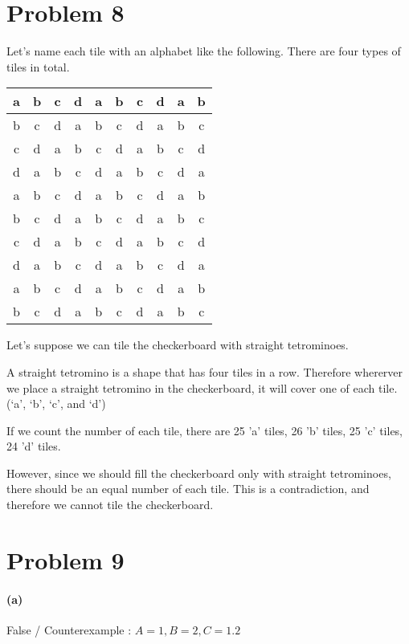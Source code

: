\documentclass[10pt]{article}
\begin{document}
\section*{Problem 8} 
Let's name each tile with an alphabet like the following. There are four types of tiles in total.
\begin{table}[H]
  \centering
  \renewcommand{\arraystretch}{1.2}
  \begin{tabular}{|c|c|c|c|c|c|c|c|c|c|}
    \hline
    a&b&c&d&a&b&c&d&a&b \\ \hline
    b&c&d&a&b&c&d&a&b&c \\ \hline
    c&d&a&b&c&d&a&b&c&d \\ \hline
    d&a&b&c&d&a&b&c&d&a \\ \hline
    a&b&c&d&a&b&c&d&a&b \\ \hline
    b&c&d&a&b&c&d&a&b&c \\ \hline
    c&d&a&b&c&d&a&b&c&d \\ \hline
    d&a&b&c&d&a&b&c&d&a \\ \hline
    a&b&c&d&a&b&c&d&a&b \\ \hline
    b&c&d&a&b&c&d&a&b&c \\ \hline
  \end{tabular}
\end{table}
Let's suppose we can tile the checkerboard with straight tetrominoes.

\vspace{0.3cm} A straight tetromino is a shape that has four tiles in a row. 
Therefore whererver we place a straight tetromino in the checkerboard, it will cover one of each tile. (`a', `b', `c', and `d')

\vspace{0.3cm} If we count the number of each tile, there are 25 'a' tiles, 26 'b' tiles, 25 'c' tiles, 24 'd' tiles.

\vspace{0.3cm} However, since we should fill the checkerboard only with straight tetrominoes, there should be an equal number of each tile.
This is a contradiction, and therefore we cannot tile the checkerboard.

\section*{Problem 9}
\setcounter{equation}{0}
\paragraph{(a)} False / Counterexample : $A = \qty{1}, B = \qty{2}, C = \qty{1, 2}$
\end{document}
